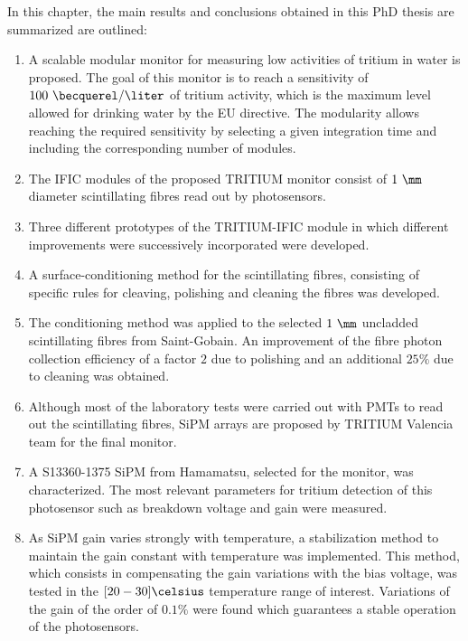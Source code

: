 In this chapter, the main results and conclusions obtained in this PhD thesis are summarized are outlined:

\begin{enumerate}
\item{} A scalable modular monitor for measuring low activities of tritium in water is proposed. The goal of this monitor is to reach a sensitivity of $100~\becquerel/\liter$ of tritium activity, which is the maximum level allowed for drinking water by the EU directive. The modularity allows reaching the required sensitivity by selecting a given integration time and including the corresponding number of modules.

\item{} The IFIC modules of the proposed TRITIUM monitor consist of $1~\mm$ diameter scintillating fibres read out by photosensors.

\item{} Three different prototypes of the TRITIUM-IFIC module in which different improvements were successively incorporated were developed.

\item{} A surface-conditioning method for the scintillating fibres, consisting of specific rules for cleaving, polishing and cleaning the fibres was developed.

\item{} The conditioning method was applied to the selected $1~\mm$ uncladded scintillating fibres from Saint-Gobain. An improvement of the fibre photon collection efficiency of a factor $2$ due to polishing and an additional $25\%$ due to cleaning was obtained.

\item{} Although most of the laboratory tests were carried out with PMTs to read out the scintillating fibres, SiPM arrays are proposed by TRITIUM Valencia team for the final monitor.

\item{} A S13360-1375 SiPM from Hamamatsu, selected for the monitor, was characterized. The most relevant parameters for tritium detection of this photosensor such as breakdown voltage and gain were measured.

\item{} As SiPM gain varies strongly with temperature, a stabilization method to maintain the gain constant with temperature was implemented. This method, which consists in compensating the gain variations with the bias voltage, was tested in the $[20-30]\celsius$ temperature range of interest. Variations of the gain of the order of $0.1\%$ were found which guarantees a stable operation of the photosensors.


\end{enumerate}
